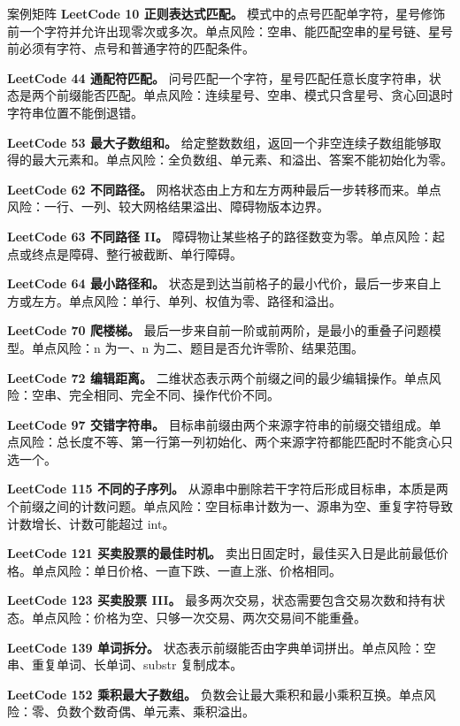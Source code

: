 \begin{principlebox}{案例矩阵}
\textbf{LeetCode 10 正则表达式匹配。}
模式中的点号匹配单字符，星号修饰前一个字符并允许出现零次或多次。单点风险：空串、能匹配空串的星号链、星号前必须有字符、点号和普通字符的匹配条件。

\textbf{LeetCode 44 通配符匹配。}
问号匹配一个字符，星号匹配任意长度字符串，状态是两个前缀能否匹配。单点风险：连续星号、空串、模式只含星号、贪心回退时字符串位置不能倒退错。

\textbf{LeetCode 53 最大子数组和。}
给定整数数组，返回一个非空连续子数组能够取得的最大元素和。单点风险：全负数组、单元素、和溢出、答案不能初始化为零。

\textbf{LeetCode 62 不同路径。}
网格状态由上方和左方两种最后一步转移而来。单点风险：一行、一列、较大网格结果溢出、障碍物版本边界。

\textbf{LeetCode 63 不同路径 II。}
障碍物让某些格子的路径数变为零。单点风险：起点或终点是障碍、整行被截断、单行障碍。

\textbf{LeetCode 64 最小路径和。}
状态是到达当前格子的最小代价，最后一步来自上方或左方。单点风险：单行、单列、权值为零、路径和溢出。

\textbf{LeetCode 70 爬楼梯。}
最后一步来自前一阶或前两阶，是最小的重叠子问题模型。单点风险：n 为一、n 为二、题目是否允许零阶、结果范围。

\textbf{LeetCode 72 编辑距离。}
二维状态表示两个前缀之间的最少编辑操作。单点风险：空串、完全相同、完全不同、操作代价不同。

\textbf{LeetCode 97 交错字符串。}
目标串前缀由两个来源字符串的前缀交错组成。单点风险：总长度不等、第一行第一列初始化、两个来源字符都能匹配时不能贪心只选一个。

\textbf{LeetCode 115 不同的子序列。}
从源串中删除若干字符后形成目标串，本质是两个前缀之间的计数问题。单点风险：空目标串计数为一、源串为空、重复字符导致计数增长、计数可能超过 int。

\textbf{LeetCode 121 买卖股票的最佳时机。}
卖出日固定时，最佳买入日是此前最低价格。单点风险：单日价格、一直下跌、一直上涨、价格相同。

\textbf{LeetCode 123 买卖股票 III。}
最多两次交易，状态需要包含交易次数和持有状态。单点风险：价格为空、只够一次交易、两次交易间不能重叠。

\textbf{LeetCode 139 单词拆分。}
状态表示前缀能否由字典单词拼出。单点风险：空串、重复单词、长单词、substr 复制成本。

\textbf{LeetCode 152 乘积最大子数组。}
负数会让最大乘积和最小乘积互换。单点风险：零、负数个数奇偶、单元素、乘积溢出。


\end{principlebox}
